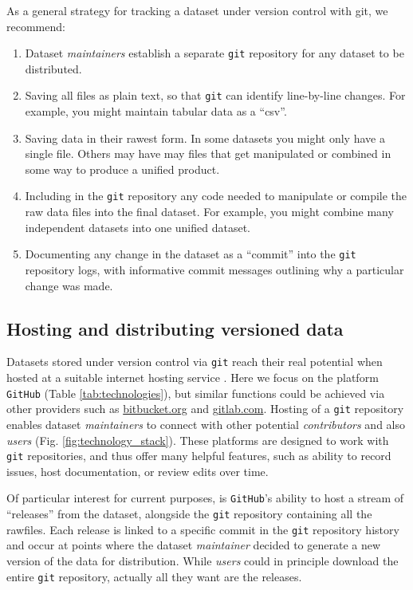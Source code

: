 \documentclass[english]{article}
\begin{document}
As a general strategy for tracking a dataset under version control with git, we recommend:
\begin{enumerate}
  \item Dataset \emph{maintainers} establish a separate \texttt{git} repository for any dataset to be distributed.
  \item Saving all files as plain text, so that \texttt{git} can identify line-by-line changes. For example, you might maintain tabular data as a ``csv''.
  \item Saving data in their rawest form. In some datasets you might only have a single file. Others may have may files that get manipulated or combined in some way to produce a unified product.
  \item Including in the \texttt{git} repository any code needed to manipulate or compile the raw data files into the final dataset. For example, you might combine many independent datasets into one unified dataset.
  \item Documenting any change in the dataset as a ``commit'' into the \texttt{git} repository logs, with informative commit messages outlining why a particular change was made.
\end{enumerate}

\subsection*{Hosting and distributing versioned data}

Datasets stored under version control via \texttt{git} reach their real potential when hosted at a suitable internet hosting service \cite{Ram-2013,Perkel-2016}. Here we focus on the platform \texttt{GitHub} (Table \ref{tab:technologies}), but similar functions could be achieved via other providers such as \href{http://bitbucket.org}{bitbucket.org} and \href{http://gitlab.com}{gitlab.com}. Hosting of a \texttt{git} repository enables dataset \emph{maintainers} to connect with other potential \emph{contributors} and also \emph{users} (Fig. \ref{fig:technology_stack}). These platforms are designed to work with \texttt{git} repositories, and thus offer many helpful features, such as ability to record issues, host documentation, or review edits over time.

Of particular interest for current purposes, is \texttt{GitHub}'s ability to host a stream of ``releases'' from the dataset, alongside the \texttt{git} repository containing all the rawfiles. Each release is linked to a specific commit in the \texttt{git} repository history and occur at points where the dataset \emph{maintainer} decided to generate a new version of the data for distribution. While \emph{users} could in principle download the entire \texttt{git} repository, actually all they want are the releases.
\end{document}
